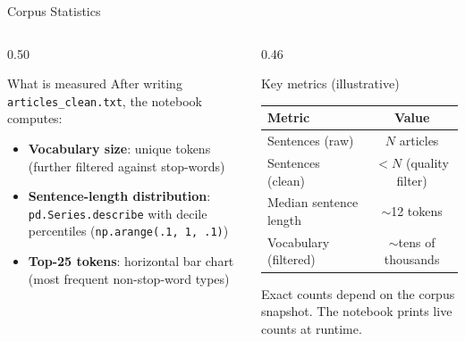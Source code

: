 \documentclass[11pt,aspectratio=169,professionalfonts]{beamer}
\begin{document}
%
%
\begin{frame}{Corpus Statistics}
\small
  \begin{columns}[T]
    \begin{column}{0.50\textwidth}
      \begin{block}{What is measured}
        After writing \texttt{articles\_clean.txt}, the notebook
        computes:
        \begin{itemize}
          \item \textbf{Vocabulary size}: unique tokens
                (further filtered against stop-words)
          \item \textbf{Sentence-length distribution}:
                \texttt{pd.Series.describe} with decile
                percentiles (\texttt{np.arange(.1, 1, .1)})
          \item \textbf{Top-25 tokens}: horizontal bar chart
                (most frequent non-stop-word types)
        \end{itemize}
      \end{block}
      \vspace{0.4em}
    \end{column}
    \begin{column}{0.46\textwidth}
      \begin{block}{Key metrics (illustrative)}
        \begin{tabular}{lc}
          \toprule
          Metric & Value \\
          \midrule
          Sentences (raw)        & $N$ articles \\
          Sentences (clean)      & $< N$ (quality filter) \\
          Median sentence length & $\sim$12 tokens \\
          Vocabulary (filtered)  & $\sim$tens of thousands \\
          \bottomrule
        \end{tabular}
        \vspace{0.4em}

        \scriptsize Exact counts depend on the corpus snapshot.
        The notebook prints live counts at runtime.
      \end{block}
    \end{column}
  \end{columns}

\end{frame}
\end{document}
